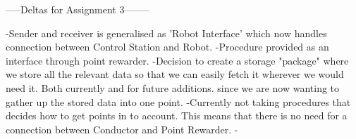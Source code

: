 

-----Deltas for Assignment 3--------

-Sender and receiver is generalised as 'Robot Interface' which now handles connection between Control Station and Robot.
-Procedure provided as an interface through point rewarder.
-Decision to create a storage "package" where we store all the relevant data so that we can easily fetch it wherever we would need it. Both currently and for future additions. since we are now wanting to gather up the stored data into one point.
-Currently not taking procedures that decides how to get points in to account. This means that there is no need for a connection between Conductor and Point Rewarder.
-